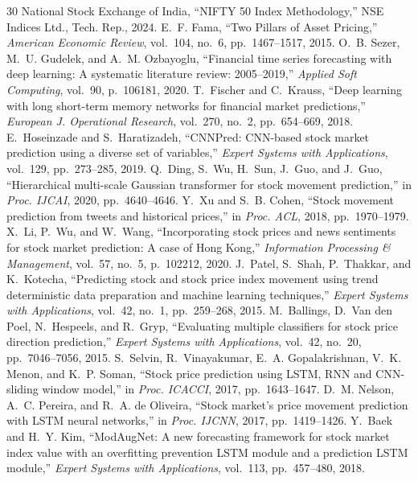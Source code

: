\documentclass[conference]{IEEEtran}
\begin{document}
\begin{thebibliography}{30}
 National Stock Exchange of India, ``NIFTY 50 Index Methodology,'' NSE Indices Ltd., Tech. Rep., 2024.
 E.~F. Fama, ``Two Pillars of Asset Pricing,'' \textit{American Economic Review}, vol.~104, no.~6, pp.~1467--1517, 2015.
 O.~B. Sezer, M.~U. Gudelek, and A.~M. Ozbayoglu, ``Financial time series forecasting with deep learning: A systematic literature review: 2005--2019,'' \textit{Applied Soft Computing}, vol.~90, p.~106181, 2020.
 T.~Fischer and C.~Krauss, ``Deep learning with long short-term memory networks for financial market predictions,'' \textit{European J. Operational Research}, vol.~270, no.~2, pp.~654--669, 2018.
 E.~Hoseinzade and S.~Haratizadeh, ``CNNPred: CNN-based stock market prediction using a diverse set of variables,'' \textit{Expert Systems with Applications}, vol.~129, pp.~273--285, 2019.
 Q.~Ding, S.~Wu, H.~Sun, J.~Guo, and J.~Guo, ``Hierarchical multi-scale Gaussian transformer for stock movement prediction,'' in \textit{Proc. IJCAI}, 2020, pp.~4640--4646.
 Y.~Xu and S.~B. Cohen, ``Stock movement prediction from tweets and historical prices,'' in \textit{Proc. ACL}, 2018, pp.~1970--1979.
 X.~Li, P.~Wu, and W.~Wang, ``Incorporating stock prices and news sentiments for stock market prediction: A case of Hong Kong,'' \textit{Information Processing \& Management}, vol.~57, no.~5, p.~102212, 2020.
 J.~Patel, S.~Shah, P.~Thakkar, and K.~Kotecha, ``Predicting stock and stock price index movement using trend deterministic data preparation and machine learning techniques,'' \textit{Expert Systems with Applications}, vol.~42, no.~1, pp.~259--268, 2015.
 M.~Ballings, D.~Van den Poel, N.~Hespeels, and R.~Gryp, ``Evaluating multiple classifiers for stock price direction prediction,'' \textit{Expert Systems with Applications}, vol.~42, no.~20, pp.~7046--7056, 2015.
 S.~Selvin, R.~Vinayakumar, E.~A. Gopalakrishnan, V.~K. Menon, and K.~P. Soman, ``Stock price prediction using LSTM, RNN and CNN-sliding window model,'' in \textit{Proc. ICACCI}, 2017, pp.~1643--1647.
 D.~M. Nelson, A.~C. Pereira, and R.~A. de Oliveira, ``Stock market's price movement prediction with LSTM neural networks,'' in \textit{Proc. IJCNN}, 2017, pp.~1419--1426.
 Y.~Baek and H.~Y. Kim, ``ModAugNet: A new forecasting framework for stock market index value with an overfitting prevention LSTM module and a prediction LSTM module,'' \textit{Expert Systems with Applications}, vol.~113, pp.~457--480, 2018.

\end{thebibliography}
\end{document}

